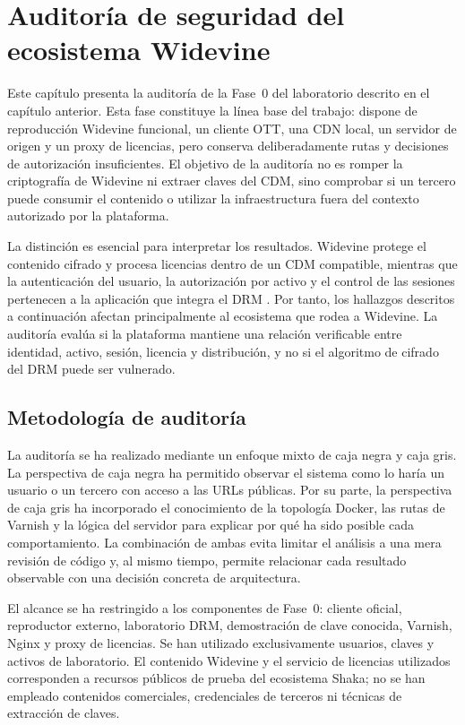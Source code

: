 
\chapter{Auditoría de seguridad del ecosistema Widevine}

Este capítulo presenta la auditoría de la Fase~0 del laboratorio descrito en el capítulo anterior. Esta fase constituye la línea base del trabajo: dispone de reproducción Widevine funcional, un cliente OTT, una CDN local, un servidor de origen y un proxy de licencias, pero conserva deliberadamente rutas y decisiones de autorización insuficientes. El objetivo de la auditoría no es romper la criptografía de Widevine ni extraer claves del CDM, sino comprobar si un tercero puede consumir el contenido o utilizar la infraestructura fuera del contexto autorizado por la plataforma.

La distinción es esencial para interpretar los resultados. Widevine protege el contenido cifrado y procesa licencias dentro de un CDM compatible, mientras que la autenticación del usuario, la autorización por activo y el control de las sesiones pertenecen a la aplicación que integra el DRM \cite{w3ceme2026,widevine2024}. Por tanto, los hallazgos descritos a continuación afectan principalmente al ecosistema que rodea a Widevine. La auditoría evalúa si la plataforma mantiene una relación verificable entre identidad, activo, sesión, licencia y distribución, y no si el algoritmo de cifrado del DRM puede ser vulnerado.

\section{Metodología de auditoría}

La auditoría se ha realizado mediante un enfoque mixto de caja negra y caja gris. La perspectiva de caja negra ha permitido observar el sistema como lo haría un usuario o un tercero con acceso a las URLs públicas. Por su parte, la perspectiva de caja gris ha incorporado el conocimiento de la topología Docker, las rutas de Varnish y la lógica del servidor para explicar por qué ha sido posible cada comportamiento. La combinación de ambas evita limitar el análisis a una mera revisión de código y, al mismo tiempo, permite relacionar cada resultado observable con una decisión concreta de arquitectura.

El alcance se ha restringido a los componentes de Fase~0: cliente oficial, reproductor externo, laboratorio DRM, demostración de clave conocida, Varnish, Nginx y proxy de licencias. Se han utilizado exclusivamente usuarios, claves y activos de laboratorio. El contenido Widevine y el servicio de licencias utilizados corresponden a recursos públicos de prueba del ecosistema Shaka; no se han empleado contenidos comerciales, credenciales de terceros ni técnicas de extracción de claves.

